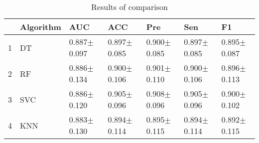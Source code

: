 \begin{table}
\footnotesize
\caption{Results of comparison}
\label{tab:comparison}
\begin{tabular}{lllllll}
\hline
 & Algorithm & AUC & ACC & Pre & Sen & F1 \\
\hline
1 & DT & 0.887$\pm$0.097 & 0.897$\pm$0.085 & 0.900$\pm$0.085 & 0.897$\pm$0.085 & 0.895$\pm$0.087 \\
2 & RF & 0.886$\pm$0.134 & 0.900$\pm$0.106 & 0.901$\pm$0.110 & 0.900$\pm$0.106 & 0.896$\pm$0.113 \\
3 & SVC & 0.886$\pm$0.120 & 0.905$\pm$0.096 & 0.908$\pm$0.096 & 0.905$\pm$0.096 & 0.900$\pm$0.102 \\
4 & KNN & 0.883$\pm$0.130 & 0.894$\pm$0.114 & 0.895$\pm$0.115 & 0.894$\pm$0.114 & 0.892$\pm$0.115 \\
\hline
\end{tabular}
\end{table}
